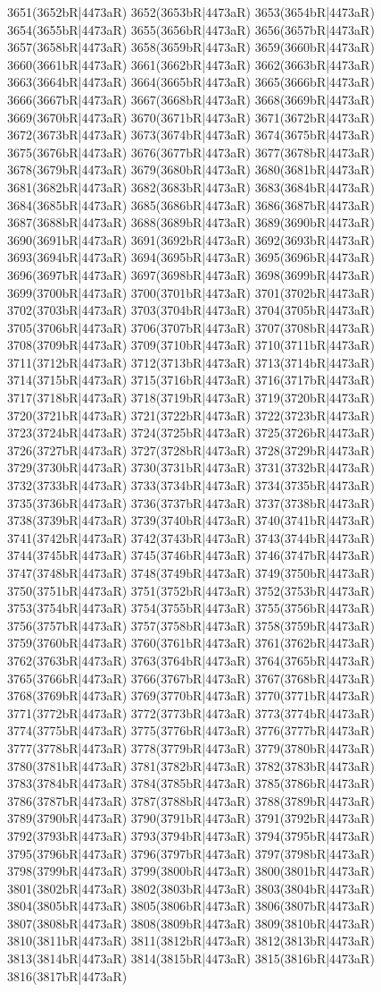 3651(3652bR|4473aR) 3652(3653bR|4473aR) 3653(3654bR|4473aR) 3654(3655bR|4473aR) 3655(3656bR|4473aR) 3656(3657bR|4473aR) 3657(3658bR|4473aR) 3658(3659bR|4473aR) 3659(3660bR|4473aR) 3660(3661bR|4473aR) 3661(3662bR|4473aR) 3662(3663bR|4473aR) 3663(3664bR|4473aR) 3664(3665bR|4473aR) 3665(3666bR|4473aR) 3666(3667bR|4473aR) 3667(3668bR|4473aR) 3668(3669bR|4473aR) 3669(3670bR|4473aR) 3670(3671bR|4473aR) 3671(3672bR|4473aR) 3672(3673bR|4473aR) 3673(3674bR|4473aR) 3674(3675bR|4473aR) 3675(3676bR|4473aR) 3676(3677bR|4473aR) 3677(3678bR|4473aR) 3678(3679bR|4473aR) 3679(3680bR|4473aR) 3680(3681bR|4473aR) 3681(3682bR|4473aR) 3682(3683bR|4473aR) 3683(3684bR|4473aR) 3684(3685bR|4473aR) 3685(3686bR|4473aR) 3686(3687bR|4473aR) 3687(3688bR|4473aR) 3688(3689bR|4473aR) 3689(3690bR|4473aR) 3690(3691bR|4473aR) 3691(3692bR|4473aR) 3692(3693bR|4473aR) 3693(3694bR|4473aR) 3694(3695bR|4473aR) 3695(3696bR|4473aR) 3696(3697bR|4473aR) 3697(3698bR|4473aR) 3698(3699bR|4473aR) 3699(3700bR|4473aR) 3700(3701bR|4473aR) 3701(3702bR|4473aR) 3702(3703bR|4473aR) 3703(3704bR|4473aR) 3704(3705bR|4473aR) 3705(3706bR|4473aR) 3706(3707bR|4473aR) 3707(3708bR|4473aR) 3708(3709bR|4473aR) 3709(3710bR|4473aR) 3710(3711bR|4473aR) 3711(3712bR|4473aR) 3712(3713bR|4473aR) 3713(3714bR|4473aR) 3714(3715bR|4473aR) 3715(3716bR|4473aR) 3716(3717bR|4473aR) 3717(3718bR|4473aR) 3718(3719bR|4473aR) 3719(3720bR|4473aR) 3720(3721bR|4473aR) 3721(3722bR|4473aR) 3722(3723bR|4473aR) 3723(3724bR|4473aR) 3724(3725bR|4473aR) 3725(3726bR|4473aR) 3726(3727bR|4473aR) 3727(3728bR|4473aR) 3728(3729bR|4473aR) 3729(3730bR|4473aR) 3730(3731bR|4473aR) 3731(3732bR|4473aR) 3732(3733bR|4473aR) 3733(3734bR|4473aR) 3734(3735bR|4473aR) 3735(3736bR|4473aR) 3736(3737bR|4473aR) 3737(3738bR|4473aR) 3738(3739bR|4473aR) 3739(3740bR|4473aR) 3740(3741bR|4473aR) 3741(3742bR|4473aR) 3742(3743bR|4473aR) 3743(3744bR|4473aR) 3744(3745bR|4473aR) 3745(3746bR|4473aR) 3746(3747bR|4473aR) 3747(3748bR|4473aR) 3748(3749bR|4473aR) 3749(3750bR|4473aR) 3750(3751bR|4473aR) 3751(3752bR|4473aR) 3752(3753bR|4473aR) 3753(3754bR|4473aR) 3754(3755bR|4473aR) 3755(3756bR|4473aR) 3756(3757bR|4473aR) 3757(3758bR|4473aR) 3758(3759bR|4473aR) 3759(3760bR|4473aR) 3760(3761bR|4473aR) 3761(3762bR|4473aR) 3762(3763bR|4473aR) 3763(3764bR|4473aR) 3764(3765bR|4473aR) 3765(3766bR|4473aR) 3766(3767bR|4473aR) 3767(3768bR|4473aR) 3768(3769bR|4473aR) 3769(3770bR|4473aR) 3770(3771bR|4473aR) 3771(3772bR|4473aR) 3772(3773bR|4473aR) 3773(3774bR|4473aR) 3774(3775bR|4473aR) 3775(3776bR|4473aR) 3776(3777bR|4473aR) 3777(3778bR|4473aR) 3778(3779bR|4473aR) 3779(3780bR|4473aR) 3780(3781bR|4473aR) 3781(3782bR|4473aR) 3782(3783bR|4473aR) 3783(3784bR|4473aR) 3784(3785bR|4473aR) 3785(3786bR|4473aR) 3786(3787bR|4473aR) 3787(3788bR|4473aR) 3788(3789bR|4473aR) 3789(3790bR|4473aR) 3790(3791bR|4473aR) 3791(3792bR|4473aR) 3792(3793bR|4473aR) 3793(3794bR|4473aR) 3794(3795bR|4473aR) 3795(3796bR|4473aR) 3796(3797bR|4473aR) 3797(3798bR|4473aR) 3798(3799bR|4473aR) 3799(3800bR|4473aR) 3800(3801bR|4473aR) 3801(3802bR|4473aR) 3802(3803bR|4473aR) 3803(3804bR|4473aR) 3804(3805bR|4473aR) 3805(3806bR|4473aR) 3806(3807bR|4473aR) 3807(3808bR|4473aR) 3808(3809bR|4473aR) 3809(3810bR|4473aR) 3810(3811bR|4473aR) 3811(3812bR|4473aR) 3812(3813bR|4473aR) 3813(3814bR|4473aR) 3814(3815bR|4473aR) 3815(3816bR|4473aR) 3816(3817bR|4473aR) 